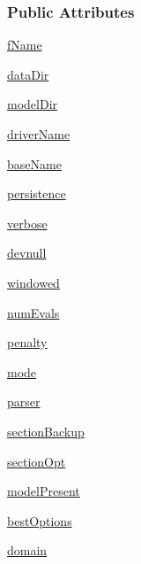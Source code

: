 \subsubsection*{Public Attributes}
\begin{DoxyCompactItemize}
\item 
\hyperlink{group__icubclient__SAM__Core_ada011a2088e06465883dae58fb0b8e8a}{f\+Name}
\item 
\hyperlink{group__icubclient__SAM__Core_a6566d06a5c1cd55aaccf308c102c0d01}{data\+Dir}
\item 
\hyperlink{group__icubclient__SAM__Core_ae1694c9aa55dfbed3bebf85db58db839}{model\+Dir}
\item 
\hyperlink{group__icubclient__SAM__Core_a6cb215002ede64a06ae5a11ffe08e757}{driver\+Name}
\item 
\hyperlink{group__icubclient__SAM__Core_a7bb67f99578949d8db57fb6461f8a7d4}{base\+Name}
\item 
\hyperlink{group__icubclient__SAM__Core_ae269bb1c23cb3337287b48cdbff04e22}{persistence}
\item 
\hyperlink{group__icubclient__SAM__Core_adb6adf608fddf052c5bdee83d407b17d}{verbose}
\item 
\hyperlink{group__icubclient__SAM__Core_afd03b85b40174227ae04c059bd3f72d4}{devnull}
\item 
\hyperlink{group__icubclient__SAM__Core_aa33d02293d13c31686171e4e7802a905}{windowed}
\item 
\hyperlink{group__icubclient__SAM__Core_ad3c1bcd3832916c225715ac8c3212856}{num\+Evals}
\item 
\hyperlink{group__icubclient__SAM__Core_a5abce7648a3e99181c46b0c68603cb3f}{penalty}
\item 
\hyperlink{group__icubclient__SAM__Core_a336eed4031c37416f75c6d759f905a0e}{mode}
\item 
\hyperlink{group__icubclient__SAM__Core_a8583398c1ec6681a7e3f50d2f08b6fb8}{parser}
\item 
\hyperlink{group__icubclient__SAM__Core_a0797610fc9dcba350e54745fb31724f4}{section\+Backup}
\item 
\hyperlink{group__icubclient__SAM__Core_a6dcf08f1fcd34970a2f12c621bca667e}{section\+Opt}
\item 
\hyperlink{group__icubclient__SAM__Core_a23a90574d02070582ab50f2be8549169}{model\+Present}
\item 
\hyperlink{group__icubclient__SAM__Core_a1e1571e4b8515ca681a5ef0619899d92}{best\+Options}
\item 
\hyperlink{group__icubclient__SAM__Core_a64afa2b9e300422eff2fde2032de2d98}{domain}

\end{DoxyCompactItemize}
